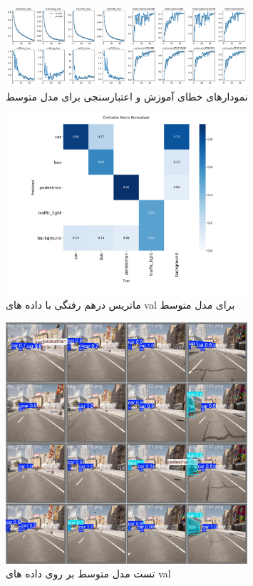 \documentclass[oneside]{report}
\begin{document}
\begin{figure}[H]
  \centering
  \includegraphics[width=0.8\textwidth]{images/medium/results.png}
  \caption{نمودارهای خطای آموزش و اعتبارسنجی برای مدل‌ متوسط}
\end{figure}
\begin{figure}[H]
  \centering
  \includegraphics[width=0.8\textwidth]{images/medium/confusion_matrix_normalized.png}
  \caption{ماتریس درهم رفتگی با داده های val برای مدل متوسط}
\end{figure}
\begin{figure}[H]
  \centering
  \includegraphics[width=0.8\textwidth]{images/medium/val_batch2_pred.jpg}
  \caption{تست مدل متوسط بر روی داده های val}
\end{figure}
\end{document}

